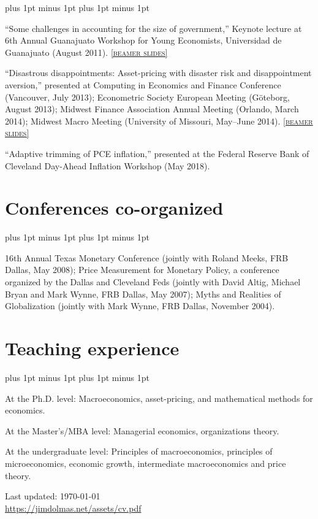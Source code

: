 \documentclass[letterpaper]{article}
\def\footerlink{https://jimdolmas.net/assets/cv.pdf}
\renewenvironment{itemize}{
  \begin{list}{}{
    \setlength{\leftmargin}{1.5em}
    \itemsep -1pt plus 1pt minus 1pt
    \topsep -1pt plus 1pt minus 1pt
  }
}{
  \end{list}
}
\begin{document}
\begin{itemize}
\item ``Some challenges in accounting for the size of government,'' Keynote lecture at 6th Annual Guanajuato Workshop for Young Economists, Universidad de Guanajuato (August 2011). \href{https://jimdolmas.github.io/assets/guanajuato.pdf}{\scriptsize\textsc{[beamer slides]}}

\item ``Disastrous disappointments: Asset-pricing with disaster risk and disappointment aversion,'' presented at Computing in Economics and Finance Conference (Vancouver, July 2013); Econometric Society European Meeting (G\"{o}teborg, August 2013); Midwest Finance Association Annual Meeting (Orlando, March 2014); Midwest Macro Meeting (University of Missouri, May--June 2014).
\href{https://jimdolmas.github.io/assets/disastrous_ESEM.pdf}{\scriptsize\textsc{[beamer slides]}}

\item ``Adaptive trimming of PCE inflation,'' presented at the Federal Reserve Bank of Cleveland Day-Ahead Inflation Workshop (May 2018).
\end{itemize}

\section*{Conferences co-organized}
\begin{itemize}
\item 16th Annual Texas Monetary Conference (jointly with Roland Meeks, FRB Dallas, May 2008); Price Measurement for Monetary Policy, a conference organized by the Dallas and Cleveland Feds (jointly with David Altig, Michael Bryan and Mark Wynne, FRB Dallas, May 2007); Myths and Realities of Globalization (jointly with Mark Wynne, FRB Dallas, November 2004).
\end{itemize}

\section*{Teaching experience}
\begin{itemize}
\item At the Ph.D. level: Macroeconomics, asset-pricing, and mathematical methods for economics.
\item At the Master's/MBA level: Managerial economics, organizations theory.
\item At the undergraduate level: Principles of macroeconomics, principles of microeconomics, economic growth, intermediate macroeconomics and price theory.
\end{itemize}
\bigskip
\begin{center}
  \begin{footnotesize}
    Last updated: \today \\
    \href{\footerlink}{\footerlink}
  \end{footnotesize}
\end{center}
\end{document}
